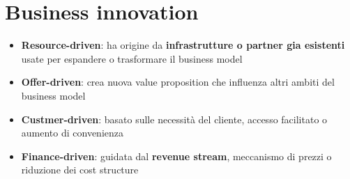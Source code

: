 \documentclass[a4paper, 12pt]{report}
\begin{document}
      \section{Business innovation}
        \begin{itemize}
          \item \textbf{Resource-driven}: ha origine da \textbf{infrastrutture o partner gia esistenti} usate per espandere o trasformare il business model 
          \item \textbf{Offer-driven}: crea nuova value proposition che influenza altri ambiti del business model
          \item \textbf{Custmer-driven}: basato sulle necessità del cliente, accesso facilitato o aumento di convenienza
          \item \textbf{Finance-driven}: guidata dal \textbf{revenue stream}, meccanismo di prezzi o riduzione dei cost structure
        \end{itemize}
\end{document}
